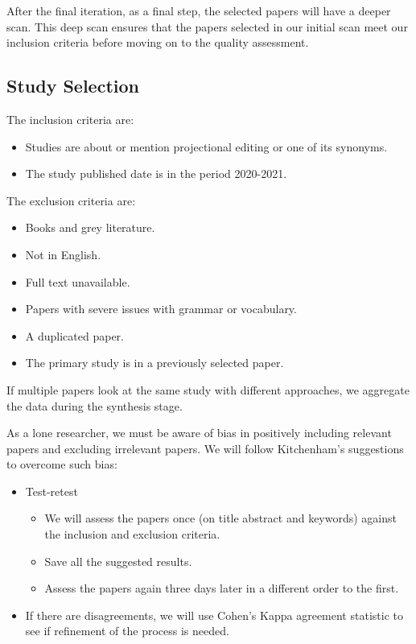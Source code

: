 After the final iteration, as a final step, the selected papers will have a deeper scan. 
This deep scan ensures that the papers selected in our initial scan meet our inclusion criteria before moving on to the quality assessment.

\subsection{Study Selection}

The inclusion criteria are:
\begin{itemize}
    \setlength\itemsep{0em}
    \item Studies are about or mention projectional editing or one of its synonyms.
    \item The study published date is in the period 2020-2021.
\end{itemize}

\noindent
The exclusion criteria are:
\begin{itemize}
    \setlength\itemsep{0em}
    \item Books and grey literature.
    \item Not in English.
    \item Full text unavailable.
    \item Papers with severe issues with grammar or vocabulary.
    \item A duplicated paper.
    \item The primary study is in a previously selected paper.
\end{itemize}

If multiple papers look at the same study with different approaches, we aggregate the data during the synthesis stage.

As a lone researcher, we must be aware of bias in positively including relevant papers and excluding irrelevant papers.
We will follow Kitchenham's suggestions to overcome such bias:
\begin{itemize}
    \setlength\itemsep{0em}
    \item Test-retest 
    \begin{itemize}
        \setlength\itemsep{0em}
        \item We will assess the papers once (on title abstract and keywords) against the inclusion and exclusion criteria.
        \item Save all the suggested results.
        \item Assess the papers again three days later in a different order to the first.  
    \end{itemize}
    \item If there are disagreements, we will use Cohen's\cite{Cohen_1960} Kappa agreement statistic to see if refinement of the process is needed.
\end{itemize} 

